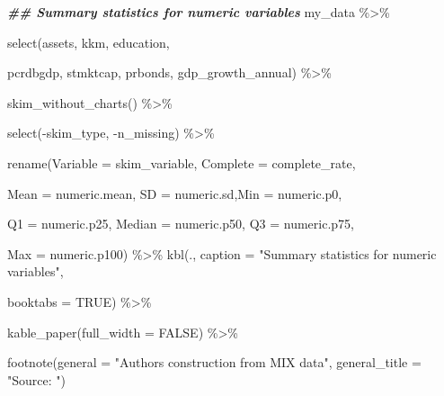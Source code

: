 \documentclass[a4paper,nobind]{templates/ociamthesis}
\newenvironment{Shaded}{\begin{snugshade}}{\end{snugshade}}
\newcommand{\AttributeTok}[1]{\textcolor[rgb]{0.77,0.63,0.00}{#1}}
\newcommand{\ConstantTok}[1]{\textcolor[rgb]{0.00,0.00,0.00}{#1}}
\newcommand{\DocumentationTok}[1]{\textcolor[rgb]{0.56,0.35,0.01}{\textbf{\textit{#1}}}}
\newcommand{\FunctionTok}[1]{\textcolor[rgb]{0.00,0.00,0.00}{#1}}
\newcommand{\NormalTok}[1]{#1}
\newcommand{\SpecialCharTok}[1]{\textcolor[rgb]{0.00,0.00,0.00}{#1}}
\newcommand{\StringTok}[1]{\textcolor[rgb]{0.31,0.60,0.02}{#1}}
\renewenvironment{Shaded}
{
  \vspace{10pt}%
  \begin{snugshade}%
}{%
  \end{snugshade}%
  \vspace{8pt}%
}
\begin{document}
\begin{Shaded}
\begin{Highlighting}[]
\DocumentationTok{\#\# Summary statistics for numeric variables }
\NormalTok{my\_data }\SpecialCharTok{\%\textgreater{}\%} 
  
  \FunctionTok{select}\NormalTok{(assets, kkm, education, }
         
\NormalTok{         pcrdbgdp, stmktcap, prbonds, gdp\_growth\_annual) }\SpecialCharTok{\%\textgreater{}\%} 
  
  \FunctionTok{skim\_without\_charts}\NormalTok{() }\SpecialCharTok{\%\textgreater{}\%} 
  
  \FunctionTok{select}\NormalTok{(}\SpecialCharTok{{-}}\NormalTok{skim\_type, }\SpecialCharTok{{-}}\NormalTok{n\_missing) }\SpecialCharTok{\%\textgreater{}\%} 
  
  \FunctionTok{rename}\NormalTok{(}\AttributeTok{Variable =}\NormalTok{ skim\_variable, }\AttributeTok{Complete =}\NormalTok{ complete\_rate, }
         
         \AttributeTok{Mean =}\NormalTok{ numeric.mean, }\AttributeTok{SD =}\NormalTok{ numeric.sd,}\AttributeTok{Min =}\NormalTok{ numeric.p0,}
         
         \AttributeTok{Q1 =}\NormalTok{ numeric.p25, }\AttributeTok{Median =}\NormalTok{ numeric.p50, }\AttributeTok{Q3 =}\NormalTok{ numeric.p75,}
         
         \AttributeTok{Max =}\NormalTok{ numeric.p100) }\SpecialCharTok{\%\textgreater{}\%} 
  \FunctionTok{kbl}\NormalTok{(., }\AttributeTok{caption =} \StringTok{"Summary statistics for numeric variables"}\NormalTok{, }
      
      \AttributeTok{booktabs =} \ConstantTok{TRUE}\NormalTok{) }\SpecialCharTok{\%\textgreater{}\%} 
  
  \FunctionTok{kable\_paper}\NormalTok{(}\AttributeTok{full\_width =} \ConstantTok{FALSE}\NormalTok{) }\SpecialCharTok{\%\textgreater{}\%} 
  
  \FunctionTok{footnote}\NormalTok{(}\AttributeTok{general =} \StringTok{"Authors\textquotesingle{} construction from MIX data"}\NormalTok{,}
           \AttributeTok{general\_title =} \StringTok{"Source: "}\NormalTok{)}
\end{Highlighting}
\end{Shaded}
\end{document}
